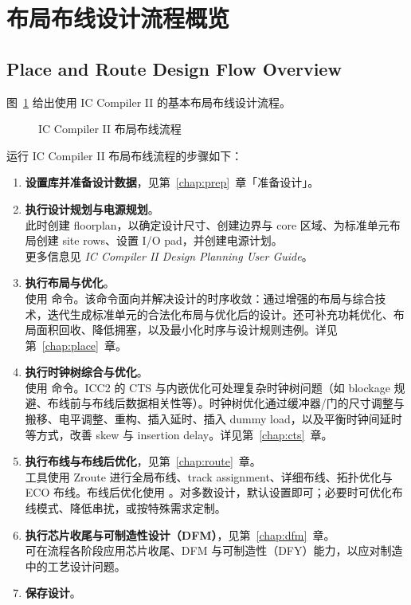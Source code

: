 \section{布局布线设计流程概览}
\subsection*{Place and Route Design Flow Overview}

图~\ref{fig:pnr-flow} 给出使用 IC Compiler II 的基本布局布线设计流程。

\begin{figure}[htbp]
\centering
{}
\caption{IC Compiler II 布局布线流程}
\label{fig:pnr-flow}
\end{figure}

运行 IC Compiler II 布局布线流程的步骤如下：

\begin{enumerate}
  \item \textbf{设置库并准备设计数据}，见第~\ref{chap:prep}~章「准备设计」。
  \item \textbf{执行设计规划与电源规划}。\\
        此时创建 floorplan，以确定设计尺寸、创建边界与 core 区域、为标准单元布局创建 site rows、设置 I/O pad，并创建电源计划。\\
        更多信息见 \textit{IC Compiler II Design Planning User Guide}。
  \item \textbf{执行布局与优化}。\\
        使用  命令。该命令面向并解决设计的时序收敛：通过增强的布局与综合技术，迭代生成标准单元的合法化布局与优化后的设计。还可补充功耗优化、布局面积回收、降低拥塞，以及最小化时序与设计规则违例。详见第~\ref{chap:place}~章。
  \item \textbf{执行时钟树综合与优化}。\\
        使用  命令。ICC2 的 CTS 与内嵌优化可处理复杂时钟树问题（如 blockage 规避、布线前与布线后数据相关性等）。时钟树优化通过缓冲器/门的尺寸调整与搬移、电平调整、重构、插入延时、插入 dummy load，以及平衡时钟间延时等方式，改善 skew 与 insertion delay。详见第~\ref{chap:cts}~章。
  \item \textbf{执行布线与布线后优化}，见第~\ref{chap:route}~章。\\
        工具使用 Zroute 进行全局布线、track assignment、详细布线、拓扑优化与 ECO 布线。布线后优化使用 。对多数设计，默认设置即可；必要时可优化布线模式、降低串扰，或按特殊需求定制。
  \item \textbf{执行芯片收尾与可制造性设计（DFM）}，见第~\ref{chap:dfm}~章。\\
        可在流程各阶段应用芯片收尾、DFM 与可制造性（DFY）能力，以应对制造中的工艺设计问题。
  \item \textbf{保存设计}。
\end{enumerate}

